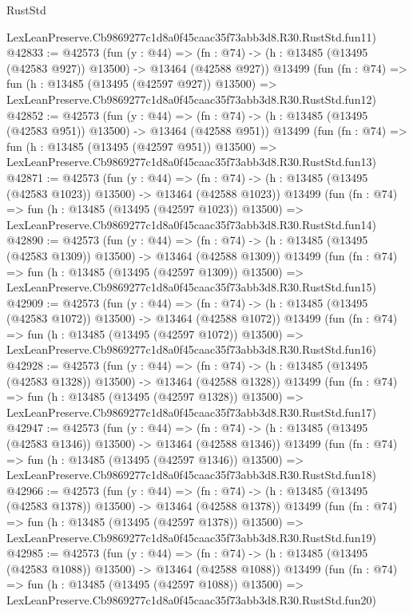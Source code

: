 \begin{lexlean}{RustStd}
\begin{coremodule}
    LexLeanPreserve.Cb9869277c1d8a0f45caac35f73abb3d8.R30.RustStd.fun11)
@42833 := @42573
    (fun (y : @44) =>
    (fn : @74) -> (h : @13485 (@13495 (@42583 @927)) @13500) -> @13464 (@42588 @927))
    @13499
    (fun (fn : @74) =>
    fun (h : @13485 (@13495 (@42597 @927)) @13500) =>
    LexLeanPreserve.Cb9869277c1d8a0f45caac35f73abb3d8.R30.RustStd.fun12)
@42852 := @42573
    (fun (y : @44) =>
    (fn : @74) -> (h : @13485 (@13495 (@42583 @951)) @13500) -> @13464 (@42588 @951))
    @13499
    (fun (fn : @74) =>
    fun (h : @13485 (@13495 (@42597 @951)) @13500) =>
    LexLeanPreserve.Cb9869277c1d8a0f45caac35f73abb3d8.R30.RustStd.fun13)
@42871 := @42573
    (fun (y : @44) =>
    (fn : @74) -> (h : @13485 (@13495 (@42583 @1023)) @13500) -> @13464 (@42588 @1023))
    @13499
    (fun (fn : @74) =>
    fun (h : @13485 (@13495 (@42597 @1023)) @13500) =>
    LexLeanPreserve.Cb9869277c1d8a0f45caac35f73abb3d8.R30.RustStd.fun14)
@42890 := @42573
    (fun (y : @44) =>
    (fn : @74) -> (h : @13485 (@13495 (@42583 @1309)) @13500) -> @13464 (@42588 @1309))
    @13499
    (fun (fn : @74) =>
    fun (h : @13485 (@13495 (@42597 @1309)) @13500) =>
    LexLeanPreserve.Cb9869277c1d8a0f45caac35f73abb3d8.R30.RustStd.fun15)
@42909 := @42573
    (fun (y : @44) =>
    (fn : @74) -> (h : @13485 (@13495 (@42583 @1072)) @13500) -> @13464 (@42588 @1072))
    @13499
    (fun (fn : @74) =>
    fun (h : @13485 (@13495 (@42597 @1072)) @13500) =>
    LexLeanPreserve.Cb9869277c1d8a0f45caac35f73abb3d8.R30.RustStd.fun16)
@42928 := @42573
    (fun (y : @44) =>
    (fn : @74) -> (h : @13485 (@13495 (@42583 @1328)) @13500) -> @13464 (@42588 @1328))
    @13499
    (fun (fn : @74) =>
    fun (h : @13485 (@13495 (@42597 @1328)) @13500) =>
    LexLeanPreserve.Cb9869277c1d8a0f45caac35f73abb3d8.R30.RustStd.fun17)
@42947 := @42573
    (fun (y : @44) =>
    (fn : @74) -> (h : @13485 (@13495 (@42583 @1346)) @13500) -> @13464 (@42588 @1346))
    @13499
    (fun (fn : @74) =>
    fun (h : @13485 (@13495 (@42597 @1346)) @13500) =>
    LexLeanPreserve.Cb9869277c1d8a0f45caac35f73abb3d8.R30.RustStd.fun18)
@42966 := @42573
    (fun (y : @44) =>
    (fn : @74) -> (h : @13485 (@13495 (@42583 @1378)) @13500) -> @13464 (@42588 @1378))
    @13499
    (fun (fn : @74) =>
    fun (h : @13485 (@13495 (@42597 @1378)) @13500) =>
    LexLeanPreserve.Cb9869277c1d8a0f45caac35f73abb3d8.R30.RustStd.fun19)
@42985 := @42573
    (fun (y : @44) =>
    (fn : @74) -> (h : @13485 (@13495 (@42583 @1088)) @13500) -> @13464 (@42588 @1088))
    @13499
    (fun (fn : @74) =>
    fun (h : @13485 (@13495 (@42597 @1088)) @13500) =>
    LexLeanPreserve.Cb9869277c1d8a0f45caac35f73abb3d8.R30.RustStd.fun20)

\end{coremodule}
\end{lexlean}
